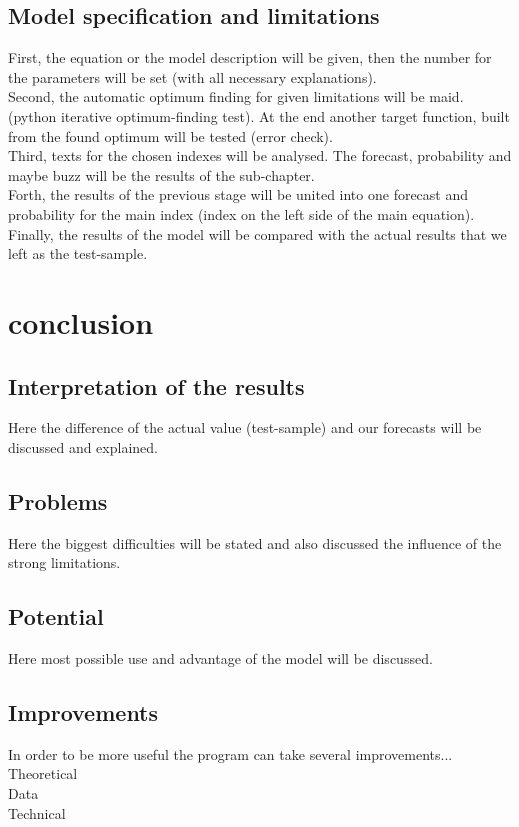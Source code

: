 \documentclass {article}
\begin{document}
\subsection{Model specification and limitations}
First, the equation or the model description will be given, then the number for the parameters will be set (with all necessary explanations).\\
Second, the automatic optimum finding for given limitations will be maid. (python iterative optimum-finding test). At the end another target function, built from the found optimum will be tested (error check).\\
Third, texts for the chosen indexes will be analysed. The forecast, probability and maybe buzz will be the results of the sub-chapter.\\
Forth, the results of the previous stage will be united into one forecast and probability for the main index (index on the left side of the main equation).\\
Finally, the results of the model will be compared with the actual results that we left as the test-sample.

\newpage
\section{conclusion}
\subsection{Interpretation of the results}
Here the difference of the actual value (test-sample) and our forecasts will be discussed and explained.
\subsection{Problems}
Here the biggest difficulties will be stated and also discussed the influence of the strong limitations.
\subsection{Potential}
Here most possible use and advantage of the model will be discussed.
\subsection{Improvements}
In order to be more useful the program can take several improvements...\\
Theoretical\\
Data\\
Technical
\end{document}

